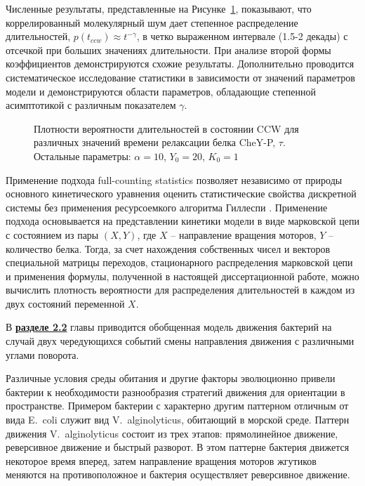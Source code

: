Численные результаты, представленные на Рисунке~\cref{fig:duration-pdf}, показывают, что коррелированный молекулярный шум дает степенное распределение длительностей, $p(t_{ccw}) \approx t^{-\gamma}$, в четко выраженном интервале (1.5-2 декады) с отсечкой при больших значениях длительности. При анализе второй формы коэффициентов демонстрируются схожие результаты. Дополнительно проводится систематическое исследование статистики в зависимости от значений параметров модели и демонстрируются области параметров, обладающие степенной асимптотикой с различным показателем $\gamma$.

\begin{figure}[ht]
    \caption{
        Плотности вероятности длительностей в состоянии CCW для различных значений времени релаксации белка CheY-P, $\tau$. Остальные параметры: $\alpha = 10$, $Y_0 = 20$, $K_0 = 1$
    }
    \label{fig:duration-pdf}
\end{figure}

Применение подхода full-counting statistics позволяет независимо от природы основного кинетического уравнения оценить статистические свойства дискретной системы без применения ресурсоемкого алгоритма Гиллеспи \cite{gillespie_stochastic_2007}. Применение подхода основывается на представлении кинетики модели в виде марковской цепи с состоянием из пары $(X,Y)$, где $X$ -- направление вращения моторов, $Y$ -- количество белка. Тогда, за счет нахождения собственных чисел и векторов специальной матрицы переходов, стационарного распределения марковской цепи и применения формулы, полученной в настоящей диссертационной работе, можно вычислить плотность вероятности для распределения длительностей в каждом из двух состояний переменной $X$. 

В \underline{\textbf{разделе 2.2}} главы приводится обобщенная модель движения бактерий на случай двух чередующихся событий смены направления движения с различными углами поворота. 

Различные условия среды обитания и другие факторы эволюционно привели бактерии к необходимости разнообразия стратегий движения для ориентации в пространстве. Примером бактерии с характерно другим паттерном отличным от вида E.~coli служит вид V.~alginolyticus, обитающий в морской среде. Паттерн движения V.~alginolyticus состоит из трех этапов: прямолинейное движение, реверсивное движение и быстрый разворот. В этом паттерне бактерия движется некоторое время вперед, затем направление вращения моторов жгутиков меняются на противоположное и бактерия осуществляет реверсивное движение. 

